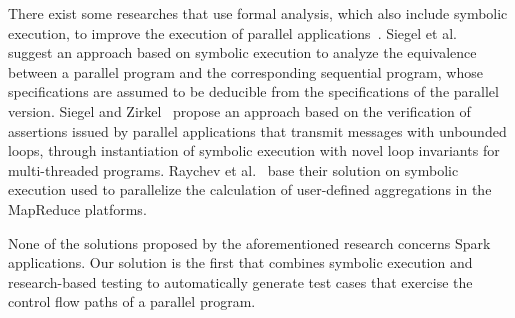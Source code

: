 There exist some researches that use formal analysis, which also include symbolic execution, to improve the execution of parallel applications~\cite{matlin:parallel:spin:2002,siegel:blobflow:pvm:2008,siegel:combining:tosem:2008,pervez:formal:spe:2010,siegel:loop-invariants:vmcai:2012,raychev:aggregations:sosp:2015}. Siegel et al.~\cite{siegel:combining:tosem:2008} suggest an approach based on symbolic execution to analyze the equivalence between a parallel program and the corresponding sequential program, whose specifications are assumed to be deducible from the specifications of the parallel version. Siegel and Zirkel~\cite{siegel:loop-invariants:vmcai:2012} propose an approach based on the verification of assertions issued by parallel applications that transmit messages with unbounded loops, through instantiation of symbolic execution with novel loop invariants for multi-threaded programs. Raychev et al.~\cite{raychev:aggregations:sosp:2015} base their solution on symbolic execution used to parallelize the calculation of user-defined aggregations in the MapReduce platforms.

None of the solutions proposed by the aforementioned research concerns Spark applications. Our solution is the first that combines symbolic execution and research-based testing to automatically generate test cases that exercise the control flow paths of a parallel program.

